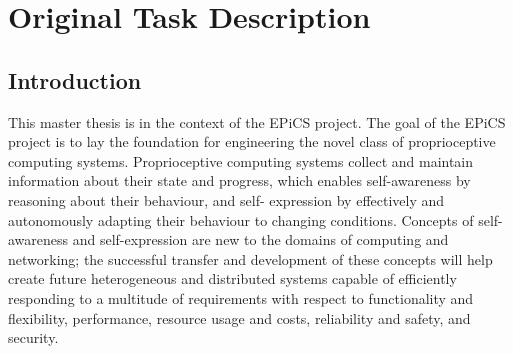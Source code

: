 \chapter{\label{originalproblem}Original Task Description}
	

\section{Introduction}
This master thesis is in the context of the EPiCS project.
The goal of the EPiCS project is to lay the foundation for engineering the novel class of proprioceptive computing systems.
Proprioceptive computing systems collect and maintain information about their state and progress, which enables self-awareness by reasoning about their behaviour, and self- expression by effectively and autonomously adapting their behaviour to changing conditions. Concepts of self-awareness and self-expression are new to the domains of computing and networking; the successful transfer and development of these concepts will help create future heterogeneous and distributed systems capable of efficiently responding to a multitude of requirements with respect to functionality and flexibility, performance, resource usage and costs, reliability and safety, and security. 

